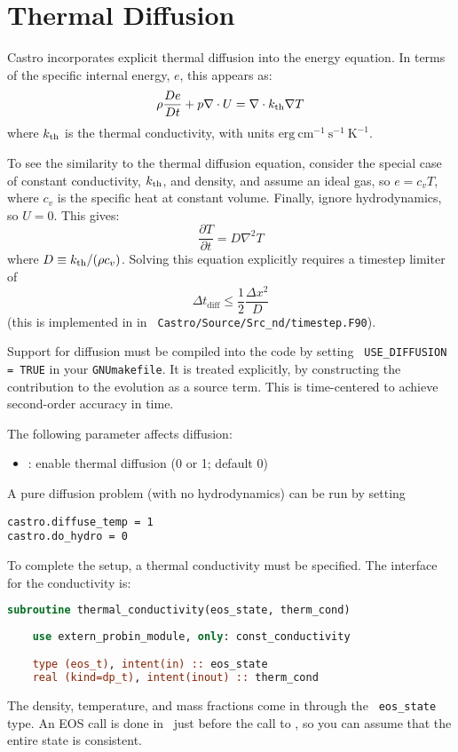 \label{ch:diffusion}

\section{Thermal Diffusion}

Castro incorporates explicit thermal diffusion into the energy equation.  
In terms of the specific internal energy, $e$, this appears as:
\begin{equation}
\rho \frac{De}{Dt} + p \nabla \cdot U = \nabla \cdot {k_\mathrm{th}} \nabla T
\end{equation}
where ${k_\mathrm{th}}$ is the thermal conductivity, with units
$\mathrm{erg~cm^{-1}~s^{-1}~K^{-1}}$.

To see the similarity to the thermal diffusion equation, consider the special
case of constant conductivity, ${k_\mathrm{th}}$, and density, and assume an
ideal gas, so $e = c_v T$, where $c_v$ is the specific heat at constant volume.
Finally, ignore hydrodynamics, so $U = 0$.  This gives:
\begin{equation}
\frac{\partial T}{\partial t} = D \nabla^2 T
\end{equation}
where $D \equiv {k_\mathrm{th}}/(\rho c_v)$.  Solving this equation
explicitly requires a timestep limiter of
\begin{equation}
\Delta t_\mathrm{diff} \le \frac{1}{2} \frac{\Delta x^2}{D}
\end{equation}
(this is implemented in  in {\tt
  Castro/Source/Src\_nd/timestep.F90}).

Support for diffusion must be compiled into the code by setting {\tt
  USE\_DIFFUSION = TRUE} in your {\tt GNUmakefile}.  It is treated
explicitly, by constructing the contribution to the evolution as a
source term.  This is time-centered to achieve second-order accuracy
in time.

The following parameter affects diffusion:
\begin{itemize}
\item {}:  enable thermal diffusion (0 or 1; default 0)
\end{itemize}

A pure diffusion problem (with no hydrodynamics) can be run by setting
\begin{verbatim}
castro.diffuse_temp = 1
castro.do_hydro = 0
\end{verbatim}

To complete the setup, a thermal conductivity must be specified.  The
interface for the conductivity is:
\begin{lstlisting}[language=fortran]
  subroutine thermal_conductivity(eos_state, therm_cond)
    
    use extern_probin_module, only: const_conductivity

    type (eos_t), intent(in) :: eos_state
    real (kind=dp_t), intent(inout) :: therm_cond
\end{lstlisting}
The density, temperature, and mass fractions come in through the {\tt
  eos\_state} type.  An EOS call is done in \castro\ just before the
call to , so you can assume that the entire
state is consistent.

